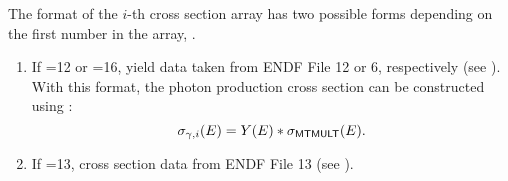 The format of the $i$-th cross section array has two possible forms depending on the first number in the array, .
\begin{enumerate}
  \item If =12 or =16, yield data taken from ENDF File 12 or 6, respectively (see ). With this format, the photon production cross section can be constructed using :
  \begin{equation}
    \sigma_{\gamma,i}(E) = Y(E)*\sigma_{\textsf{MTMULT}}(E).
    \label{eq:PhotonProductionConstruction}
  \end{equation}
  \item If =13, cross section data from ENDF File 13 (see ).
\end{enumerate}

